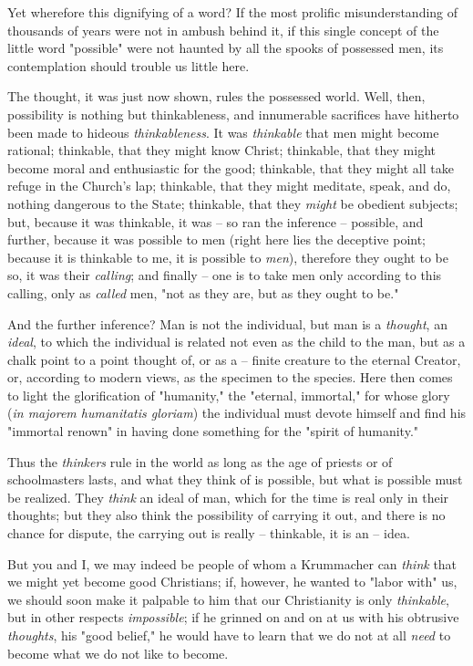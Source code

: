\documentclass[a4paper]{book}
\begin{document}
Yet wherefore this dignifying of a word? If the most prolific misunderstanding 
of thousands of years were not in ambush behind it, if this single concept of 
the little word "{}possible"{} were not haunted by all the spooks of possessed 
men, its contemplation should trouble us little here.

The thought, it was just now shown, rules the possessed world. Well, then, 
possibility is nothing but thinkableness, and innumerable sacrifices have 
hitherto been made to hideous \textit{thinkableness}. It was 
\textit{thinkable} that men might become rational; thinkable, that they might 
know Christ; thinkable, that they might become moral and enthusiastic for the 
good; thinkable, that they might all take refuge in the Church's lap; 
thinkable, that they might meditate, speak, and do, nothing dangerous to the 
State; thinkable, that they \textit{might} be obedient subjects; but, because 
it was thinkable, it was -- so ran the inference -- possible, and further, 
because it was possible to men (right here lies the deceptive point; because 
it is thinkable to me, it is possible to \textit{men}), therefore they ought 
to be so, it was their \textit{calling}; and finally -- one is to take men 
only according to this calling, only as \textit{called} men, "{}not as they 
are, but as they ought to be."{}

And the further inference? Man is not the individual, but man is a 
\textit{thought}, an \textit{ideal}, to which the individual is related not 
even as the child to the man, but as a chalk point to a point thought of, or 
as a -- finite creature to the eternal Creator, or, according to modern views, 
as the specimen to the species. Here then comes to light the glorification of 
"{}humanity,"{} the "{}eternal, immortal,"{} for whose glory (\textit{in 
majorem humanitatis gloriam}) the individual must devote himself and find his 
"{}immortal renown"{} in having done something for the "{}spirit of 
humanity."{}

Thus the \textit{thinkers} rule in the world as long as the age of priests or 
of schoolmasters lasts, and what they think of is possible, but what is 
possible must be realized. They \textit{think} an ideal of man, which for the 
time is real only in their thoughts; but they also think the possibility of 
carrying it out, and there is no chance for dispute, the carrying out is 
really -- thinkable, it is an -- idea.

But you and I, we may indeed be people of whom a Krummacher can \textit{think} 
that we might yet become good Christians; if, however, he wanted to "{}labor 
with"{} us, we should soon make it palpable to him that our Christianity is 
only \textit{thinkable}, but in other respects \textit{impossible}; if he 
grinned on and on at us with his obtrusive \textit{thoughts}, his "{}good 
belief,"{} he would have to learn that we do not at all \textit{need} to 
become what we do not like to become.
\end{document}
